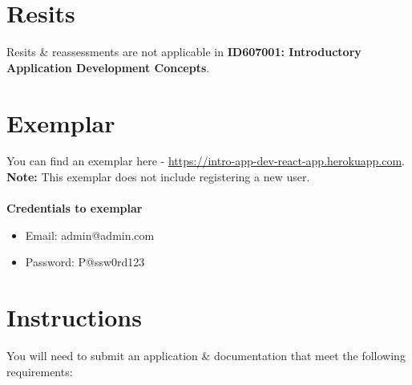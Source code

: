 \documentclass{article}
\begin{document}
\section*{Resits}
Resits \& reassessments are not applicable in \textbf{ID607001: Introductory Application Development Concepts}. 

\newpage

\section*{Exemplar}
You can find an exemplar here - \small\href{https://intro-app-dev-react-app.herokuapp.com}{https://intro-app-dev-react-app.herokuapp.com}. \textbf{Note:} This exemplar does not include registering a new user. \\ \\
\textbf{Credentials to exemplar}
\begin{itemize}
	\item Email: admin@admin.com
	\item Password: P@ssw0rd123
\end{itemize}

\section*{Instructions}
You will need to submit an application \& documentation that meet the following requirements:
\end{document}
